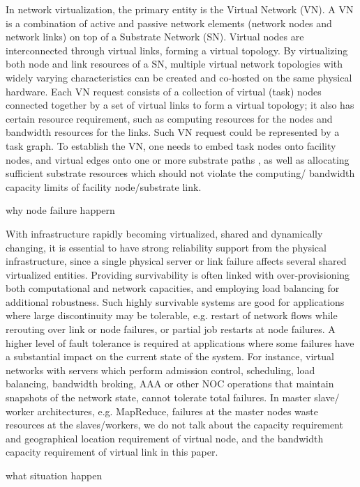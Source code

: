 In network virtualization, the primary entity is the Virtual Network (VN). A VN is a combination of active and passive network elements (network nodes and network links) on top of a Substrate Network (SN). Virtual nodes are interconnected through virtual links, forming a virtual topology. By virtualizing both node and link resources of a SN, multiple virtual network topologies with widely varying characteristics can be created and co-hosted on the same physical hardware.
Each VN request consists of a collection of virtual (task) nodes connected together by a set of virtual links to form a virtual topology; it also has certain resource requirement, such as computing resources for the nodes and bandwidth resources for the links. Such VN request could be represented by a task graph. To establish the VN, one needs to embed task nodes onto facility nodes, and virtual edges onto one or more substrate paths\cite{yu2008rethinking} , as well as allocating sufficient substrate resources which should not violate the computing/ bandwidth capacity limits of facility node/substrate link.



why node failure happern

With infrastructure rapidly becoming virtualized, shared and dynamically changing, it is essential to have strong reliability support from the physical infrastructure, since a single physical server or link failure affects several shared virtualized entities. Providing survivability is often linked with over-provisioning both computational and network capacities, and employing load balancing for additional robustness. Such highly survivable systems are good for applications where large discontinuity may be tolerable, e.g. restart of network flows while rerouting over link or node failures, or partial job restarts at node failures. A higher level of fault tolerance is required at applications where some failures have a substantial impact on the current state of the system. For instance, virtual networks with servers which perform admission control, scheduling, load balancing, bandwidth broking, AAA or other NOC operations that maintain snapshots of the network state, cannot tolerate total failures. In master slave/ worker architectures, e.g. MapReduce, failures at the master nodes waste resources at the slaves/workers, we do not talk about the capacity requirement and geographical location requirement of virtual node, and the bandwidth capacity requirement of virtual link in this paper.

what situation happen

